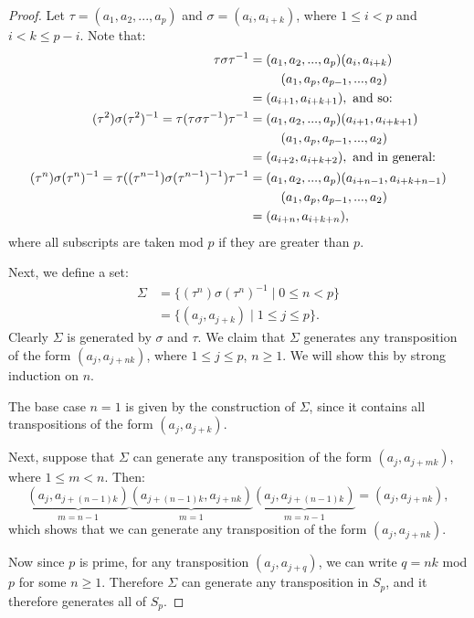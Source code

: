 \documentclass{article}
\begin{document}
\begin{proof}
    Let $\tau = (a_1, a_2, ..., a_p)$ and $\sigma = (a_i, a_{i + k})$, where $1 \leq i < p$ and $i < k \leq p - i$. Note that:
    \begin{align*}
        \tau \sigma \tau^{-1} &= (a_1, a_2, ..., a_p)(a_i, a_{i + k}) \\
        & \hspace{2.5em} (a_1, a_p, a_{p - 1}, ..., a_2) \\
        &= (a_{i + 1}, a_{i + k + 1}), \text{ and so:} \\
        (\tau^2) \sigma (\tau^2)^{-1} = \tau (\tau \sigma \tau^{-1}) \tau^{-1} &= (a_1, a_2, ..., a_p)(a_{i + 1}, a_{i + k + 1}) \\
        & \hspace{2.5em} (a_1, a_p, a_{p - 1}, ..., a_2) \\
        &= (a_{i + 2}, a_{i + k + 2}), \text{ and in general:} \\
        (\tau^n) \sigma (\tau^n)^{-1} = \tau ((\tau^{n - 1}) \sigma (\tau^{n - 1})^{-1}) \tau^{-1} &= (a_1, a_2, ..., a_p)(a_{i + n - 1}, a_{i + k + n - 1}) \\
        & \hspace{2.5em} (a_1, a_p, a_{p - 1}, ..., a_2) \\
        &= (a_{i + n}, a_{i + k + n}),
    \end{align*}
    where all subscripts are taken mod $p$ if they are greater than $p$.


    Next, we define a set:
    \begin{align*}
        \Sigma &= \{ (\tau^n)\sigma(\tau^n)^{-1} \mid 0 \leq n < p \} \\
        &= \{ (a_j, a_{j + k}) \mid 1 \leq j \leq p \}.
    \end{align*}
    Clearly $\Sigma$ is generated by $\sigma$ and $\tau$. We claim that $\Sigma$ generates any transposition of the form $(a_j, a_{j + nk})$, where $1 \leq j \leq p$, $n \geq 1$. We will show this by strong induction on $n$.

    The base case $n = 1$ is given by the construction of $\Sigma$, since it contains all transpositions of the form $(a_j, a_{j + k})$.

    Next, suppose that $\Sigma$ can generate any transposition of the form $(a_j, a_{j + mk})$, where $1 \leq m < n$. Then:
    \begin{equation*}
        \underbrace{(a_j, a_{j + (n - 1)k})}_{m = n - 1} \underbrace{(a_{j + (n - 1)k}, a_{j + nk})}_{m = 1}\underbrace{(a_j, a_{j + (n - 1)k})}_{m = n - 1} = (a_j, a_{j + nk}),
    \end{equation*}
    which shows that we can generate any transposition of the form $(a_j, a_{j + nk})$.

    Now since $p$ is prime, for any transposition $(a_j, a_{j + q})$, we can write $q = nk$ mod $p$ for some $n \geq 1$. Therefore $\Sigma$ can generate any transposition in $S_p$, and it therefore generates all of $S_p$.
\end{proof}
\end{document}
